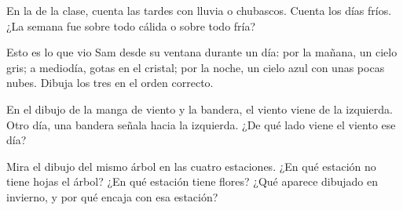 \begin{exercise}[$\star\star$]\label{exo:g1:watching-the-weather:8}
En la  de la clase, cuenta las tardes con lluvia o
chubascos. Cuenta los días fríos. ¿La semana fue sobre todo cálida o sobre
todo fría?
\end{exercise}

\begin{exercise}[$\star\star$]\label{exo:g1:watching-the-weather:9}
Esto es lo que vio Sam desde su ventana durante un día: por la mañana, un
cielo gris; a mediodía, gotas en el cristal; por la noche, un cielo azul con
unas pocas nubes. Dibuja los tres  en el orden correcto.
\end{exercise}

\begin{exercise}[$\star\star$]\label{exo:g1:watching-the-weather:10}
En el dibujo de la manga de viento y la bandera, el viento viene de la
izquierda. Otro día, una bandera señala hacia la izquierda. ¿De qué lado
viene el viento ese día?
\end{exercise}

\begin{exercise}[$\star\star$]\label{exo:g1:watching-the-weather:11}
Mira el dibujo del mismo árbol en las cuatro estaciones. ¿En qué estación no
tiene hojas el árbol? ¿En qué estación tiene flores? ¿Qué 
aparece dibujado en invierno, y por qué encaja con esa estación?
\end{exercise}

